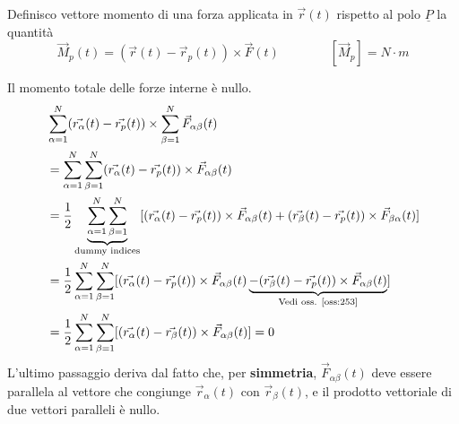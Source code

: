 \begin{definition}
	Definisco vettore momento di una forza applicata in $\vec{r}(t)$ rispetto al polo $\underline{P}$ la quantità
	\begin{equation}
		\label{eq:vetmom}
		\vec{M}_p(t) = (\vec{r}(t) -\vec{r}_p(t)) \times \vec{F}(t) \qquad\qquad [\vec{M}_p] = N \cdot m
	\end{equation}
\end{definition}

\begin{observation}
	Il momento totale delle forze interne è nullo.
	\begin{align*}
		& \sum_{\alpha=1}^N ( \vec{r_\alpha}(t) - \vec{r_p}(t)) \times \sum_{\beta=1}^N \vec{F}_{\alpha\beta}(t)\\
		& = \sum_{\alpha=1}^N \sum_{\beta=1}^N ( \vec{r_\alpha}(t) - \vec{r_p}(t)) \times \vec{F}_{\alpha\beta}(t)\\
		& = \frac{1}{2} \underbrace{\sum_{\alpha=1}^N \sum_{\beta=1}^N}_\text{dummy indices} [( \vec{r_\alpha}(t) - \vec{r_p}(t)) \times \vec{F}_{\alpha\beta}(t) + ( \vec{r_\beta}(t) - \vec{r_p}(t)) \times \vec{F}_{\beta\alpha}(t)] \\
		& = \frac{1}{2} \sum_{\alpha=1}^N \sum_{\beta=1}^N [( \vec{r_\alpha}(t) - \vec{r_p}(t)) \times \vec{F}_{\alpha\beta}(t)\underbrace{ - ( \vec{r_\beta}(t) - \vec{r_p}(t)) \times \vec{F}_{\alpha\beta}(t)}_\text{Vedi oss. \ref{oss:253}}] \\
		& = \frac{1}{2} \sum_{\alpha=1}^N \sum_{\beta=1}^N [( \vec{r_\alpha}(t) - \vec{r_\beta}(t)) \times \vec{F}_{\alpha\beta}(t)] = 0
	\end{align*}
	L'ultimo passaggio deriva dal fatto che, per \textbf{simmetria}, $\vec{F}_{\alpha\beta}(t)$ deve essere parallela al vettore che congiunge $\vec{r}_\alpha(t)$ con $\vec{r}_\beta(t)$, e il prodotto vettoriale di due vettori paralleli è nullo.
\end{observation}

